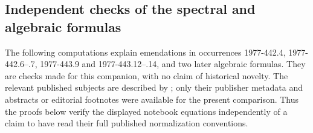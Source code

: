 \subsection{Independent checks of the spectral and algebraic formulas}

The following computations explain emendations in occurrences
1977-442.4, 1977-442.6--.7, 1977-443.9 and 1977-443.12--.14, and two later
algebraic formulas. They are checks made for this companion, with no claim
of historical novelty. The relevant published subjects are described by
\citet{calogerodegasperis1976inverse,calogerodegasperis1978extension,
calogero1978motion}; only their publisher metadata and abstracts or
editorial footnotes were available for the present comparison. Thus the
proofs below verify the displayed notebook equations independently of a
claim to have read their full published normalization conventions.

